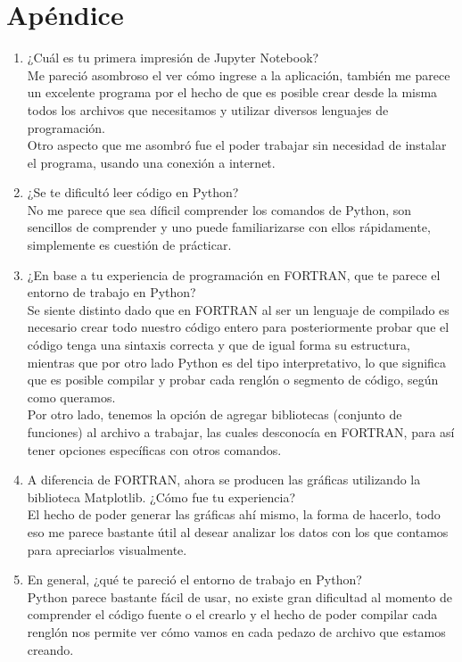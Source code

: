 \section{Apéndice}
\begin{enumerate}
\item ¿Cuál es tu primera impresión de Jupyter Notebook? 
\medskip
\\ Me pareció asombroso el ver cómo ingrese a la aplicación, también me parece un excelente programa por el hecho de que es posible crear desde la misma todos los archivos que necesitamos y utilizar diversos lenguajes de programación.
\\Otro aspecto que me asombró fue el poder trabajar sin necesidad de instalar el programa, usando una conexión a internet.

\item ¿Se te dificultó leer código en Python?
\medskip
\\ No me parece que sea díficil comprender los comandos de Python, son sencillos de comprender y uno puede familiarizarse con ellos rápidamente, simplemente es cuestión de prácticar.

\item ¿En base a tu experiencia de programación en FORTRAN, que te parece el entorno de trabajo en Python?
\medskip
\\ Se siente distinto dado que en FORTRAN al ser un lenguaje de compilado es necesario crear todo nuestro código entero para posteriormente probar que el código tenga una sintaxis correcta y que de igual forma su estructura, mientras que por otro lado Python es del tipo interpretativo, lo que significa que es posible compilar y probar cada renglón o segmento de código, según como queramos.
\\ Por otro lado, tenemos la opción de agregar bibliotecas (conjunto de funciones) al archivo a trabajar, las cuales desconocía en FORTRAN, para así tener opciones específicas con otros comandos.

\item A diferencia de FORTRAN, ahora se producen las gráficas utilizando la biblioteca Matplotlib. ¿Cómo fue tu experiencia?
\medskip
\\ El hecho de poder generar las gráficas ahí mismo, la forma de hacerlo, todo eso me parece bastante útil al desear analizar los datos con los que contamos para apreciarlos visualmente.

\item En general, ¿qué te pareció el entorno de trabajo en Python?
\medskip
\\ Python parece bastante fácil de usar, no existe gran dificultad al momento de comprender el código fuente o el crearlo y el hecho de poder compilar cada renglón nos permite ver cómo vamos en cada pedazo de archivo que estamos creando.


\end{enumerate}
